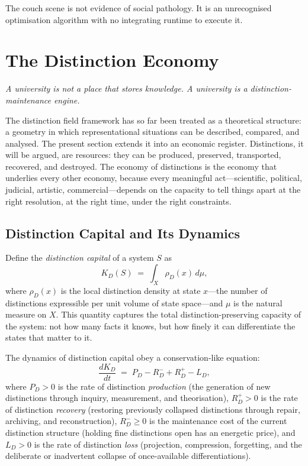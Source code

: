 \documentclass[12pt, letterpaper]{article}
\theoremstyle{remark}
\begin{document}
The couch scene is not evidence of social pathology.  It is an unrecognised
optimisation algorithm with no integrating runtime to execute it.

\section{The Distinction Economy}

\epigraph{\itshape A university is not a place that stores knowledge.
A university is a distinction-maintenance engine.}{}

The distinction field framework has so far been treated as a theoretical
structure: a geometry in which representational situations can be described,
compared, and analysed.  The present section extends it into an economic
register.  Distinctions, it will be argued, are resources: they can be
produced, preserved, transported, recovered, and destroyed.  The economy
of distinctions is the economy that underlies every other economy, because
every meaningful act---scientific, political, judicial, artistic,
commercial---depends on the capacity to tell things apart at the right
resolution, at the right time, under the right constraints.

\subsection{Distinction Capital and Its Dynamics}

Define the \emph{distinction capital} of a system $S$ as
\begin{equation}
  K_D(S) \;=\; \int_X \rho_D(x)\,d\mu,
\end{equation}
where $\rho_D(x)$ is the local distinction density at state $x$---the
number of distinctions expressible per unit volume of state space---and $\mu$
is the natural measure on $X$.  This quantity captures the total
distinction-preserving capacity of the system: not how many facts it knows,
but how finely it can differentiate the states that matter to it.

The dynamics of distinction capital obey a conservation-like equation:
\begin{equation}
  \frac{dK_D}{dt} \;=\; P_D - R_D^{-} + R_D^{+} - L_D,
\end{equation}
where $P_D > 0$ is the rate of distinction \emph{production} (the generation
of new distinctions through inquiry, measurement, and theorisation),
$R_D^{+} > 0$ is the rate of distinction \emph{recovery} (restoring previously
collapsed distinctions through repair, archiving, and reconstruction),
$R_D^{-} \geq 0$ is the maintenance cost of the current distinction structure
(holding fine distinctions open has an energetic price), and $L_D > 0$ is
the rate of distinction \emph{loss} (projection, compression, forgetting,
and the deliberate or inadvertent collapse of once-available differentiations).
\end{document}
